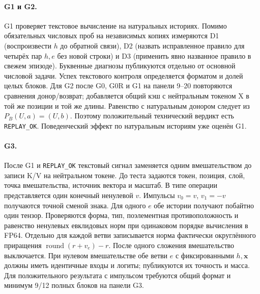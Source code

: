 \paragraph{G1 и G2.}
G1 проверяет текстовое вычисление на натуральных историях. Помимо
обязательных числовых проб на независимых копиях измеряются D1 (воспроизвести
$h$ до обратной связи), D2 (назвать исправленное правило для четырёх пар
$h,e$ без новой строки) и D3 (применить явно названное правило в свежем
эпизоде). Буквенные диагнозы публикуются отдельно от основной числовой
задачи. Успех текстового контроля определяется форматом и долей целых
блоков. Для G2 после G0, G0R и G1 на панели 9--20 повторяются сравнения
донор/возврат; добавляется общий кэш с нейтральным токеном X в той же
позиции и той же длины. Равенство с натуральным донором следует из
$P_B(U,a)=(U,b)$. Поэтому положительный технический вердикт есть
\texttt{REPLAY\_OK}. Поведенческий эффект по натуральным историям
уже оценён G1.

\paragraph{G3.}
После G1 и \texttt{REPLAY\_OK} текстовый сигнал заменяется одним
вмешательством до записи K/V на нейтральном токене. До теста задаются токен,
позиция, слой, точка вмешательства, источник вектора и масштаб. В типе
операции представляется один конечный ненулевой $v$. Импульсы $v_0=v$, $v_1=-v$
получаются точной сменой знака. Для одного $e$ обе истории получают
побайтно один тензор. Проверяются форма, тип, поэлементная противоположность
и равенство ненулевых евклидовых норм при одинаковом порядке вычисления в
FP64. Отдельно для каждой ветви записывается норма фактически округлённого
приращения $\operatorname{round}(r+v_e)-r$. После одного сложения
вмешательство выключается. При нулевом вмешательстве обе ветви $e$ с
фиксированными $h,\mathbf{x}$ должны иметь идентичные входы и логиты;
публикуются их точность и масса. Для положительного результата с импульсом
требуются общий формат и минимум 9/12 полных блоков на панели G3.

